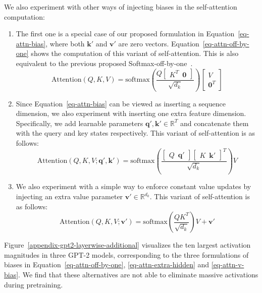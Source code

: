 \documentclass[10pt]{article}
\theoremstyle{definition}
\theoremstyle{plain}
\newcommand{\mbf}[1]{\mathbf{#1}}
\begin{document}
We also experiment with other ways of injecting biases in the self-attention computation: 
\begin{enumerate}[topsep=-2.pt,itemsep=-2.ex]\item The first one is a special case of our proposed formulation in Equation~\ref{eq-attn-bias}, where both $\mbf{k'}$ and $\mbf{v'}$ are zero vectors. Equation~\ref{eq-attn-off-by-one} shows the computation of this variant of self-attention. This is also equivalent to the previous proposed Softmax-off-by-one~\citep{miller2023attention}.
\begin{equation}\label{eq-attn-off-by-one}
    \text{Attention}(Q, K, V) = \text{softmax}\left(\frac{Q \begin{bmatrix}
        K^{T}\,\,\,\mbf{0}
    \end{bmatrix}}{\sqrt{d_k}}\right)\begin{bmatrix}
        V \\ 
        \mbf{0}^{T}   \end{bmatrix}
\end{equation}
\item Since Equation~\ref{eq-attn-bias} can be viewed as inserting a sequence dimension, we also experiment with inserting one extra feature dimension. Specifically, we add learnable parameters $\mbf{q'},\mbf{k'}\in\mathbb{R}^{T}$ and concatenate them with the query and key states respectively. This variant of self-attention is as follows:
\begin{equation}\label{eq-attn-extra-hidden}
    \text{Attention}(Q, K, V; \mbf{q'}, \mbf{k'}) = \text{softmax}\left(
    \frac{
    \begin{bmatrix}
    Q \,\,\, \mbf{q'}
    \end{bmatrix}
    \begin{bmatrix}
    K \,\,\, \mbf{k'}
    \end{bmatrix}^{T}
    }
    {\sqrt{d_k}}\right)V
\end{equation}
\item We also experiment with a simple way to enforce constant value updates by injecting an extra value parameter $\mbf{v'}\in\mathbb{R}^{d_{k}}$. This variant of self-attention is as follows:
\begin{equation}\label{eq-attn-v-bias}
    \text{Attention}(Q, K, V; \mbf{v'}) = \text{softmax}\left(
    \frac{
    Q
    K^{T} 
    }
    {\sqrt{d_k}}\right)V+\mbf{v'}
\end{equation}
\end{enumerate}
Figure~\ref{appendix-gpt2-layerwise-additional} visualizes the ten largest activation magnitudes in three GPT-2 models, corresponding to the three formulations of biases in Equation~\ref{eq-attn-off-by-one}, \ref{eq-attn-extra-hidden} and \ref{eq-attn-v-bias}. We find that these alternatives are not able to eliminate massive activations during pretraining.
\end{document}
